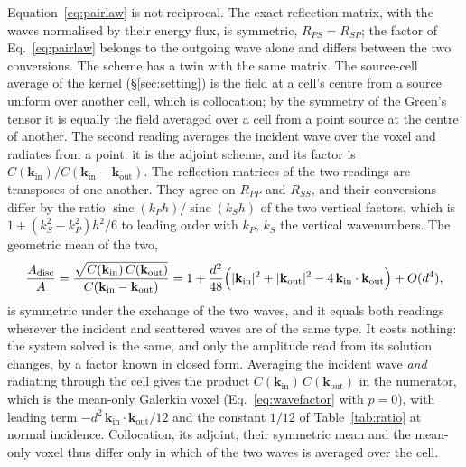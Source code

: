 \documentclass[11pt,a4paper]{article}
\newcommand{\sinc}{\operatorname{sinc}}
\begin{document}
Equation~\eqref{eq:pairlaw} is not reciprocal. The exact reflection matrix, with the waves normalised by
their energy flux, is symmetric, $R_{PS}=R_{SP}$; the factor of Eq.~\eqref{eq:pairlaw} belongs to the
outgoing wave alone and differs between the two conversions. The scheme has a twin with the same matrix.
The source-cell average of the kernel (\S\ref{sec:setting}) is the field at a cell's centre from a source
uniform over another cell, which is collocation; by the symmetry of the Green's tensor it is equally the
field averaged over a cell from a point source at the centre of another. The second reading averages the
incident wave over the voxel and radiates from a point: it is the adjoint scheme, and its factor is
$C(\mathbf{k}_{\text{in}})/C(\mathbf{k}_{\text{in}}-\mathbf{k}_{\text{out}})$. The reflection matrices of
the two readings are transposes of one another. They agree on $R_{PP}$ and $R_{SS}$, and their conversions
differ by the ratio $\sinc(k_Ph)/\sinc(k_Sh)$ of the two vertical factors, which is
$1+(k_S^2-k_P^2)h^2/6$ to leading order with $k_P$, $k_S$ the vertical wavenumbers. The geometric mean of
the two,
\begin{equation}\label{eq:pairsym}
  \frac{A_{\text{disc}}}{A}
  =\frac{\sqrt{C(\mathbf{k}_{\text{in}})\,C(\mathbf{k}_{\text{out}})}}{C(\mathbf{k}_{\text{in}}-\mathbf{k}_{\text{out}})}
  =1+\frac{d^2}{48}\Bigl(\lvert\mathbf{k}_{\text{in}}\rvert^2+\lvert\mathbf{k}_{\text{out}}\rvert^2
     -4\,\mathbf{k}_{\text{in}}\cdot\mathbf{k}_{\text{out}}\Bigr)+O(d^4),
\end{equation}
is symmetric under the exchange of the two waves, and it equals both readings wherever the incident and
scattered waves are of the same type. It costs nothing: the system solved is the same, and only the
amplitude read from its solution changes, by a factor known in closed form. Averaging the incident wave
\emph{and} radiating through the cell gives the product $C(\mathbf{k}_{\text{in}})\,C(\mathbf{k}_{\text{out}})$
in the numerator, which is the mean-only Galerkin voxel (Eq.~\eqref{eq:wavefactor} with $p=0$), with
leading term $-d^2\,\mathbf{k}_{\text{in}}\cdot\mathbf{k}_{\text{out}}/12$ and the constant $1/12$ of
Table~\ref{tab:ratio} at normal incidence. Collocation, its adjoint, their symmetric mean and the
mean-only voxel thus differ only in which of the two waves is averaged over the cell.
\end{document}
